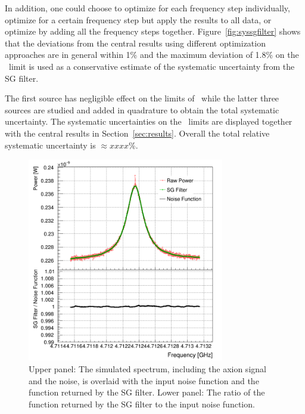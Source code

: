 \begin{itemize}
In addition, one could choose to optimize for each frequency step 
individually, optimize for a certain frequency step but apply the results to 
all data, or optimize by adding all the frequency steps together. 
Figure~\ref{fig:syssgfilter} shows that 
the deviations from the central results using different optimization 
approaches are in general within 1\% and the 
maximum deviation of 1.8\% 
on the \gagg\ limit is used as a conservative estimate of the systematic 
uncertainty from the SG filter. 

\end{itemize}

The first source has negligible effect on the limits of \gagg\ while the 
latter three sources are studied and added in quadrature to obtain the total 
systematic uncertainty. The systematic uncertainties on the \gagg\ limits 
are displayed together with the central results in Section~\ref{sec:results}. 
Overall the total relative systematic uncertainty is $\approx xxxx$\%.

\begin{figure} [htbp]
  \centering
  \includegraphics[width=8.6cm]{figures/GeneratedSpectrum_Optimized_SGFilter_NPar_3_Window_141.png}
  \caption{Upper panel: 
 The simulated spectrum, including the axion signal and the noise, 
 is overlaid with the input noise function and the function returned by 
 the SG filter. Lower panel: The ratio of the function returned by the SG 
 filter to the input noise function.}
  \label{fig:sgcompare}
\end{figure}


